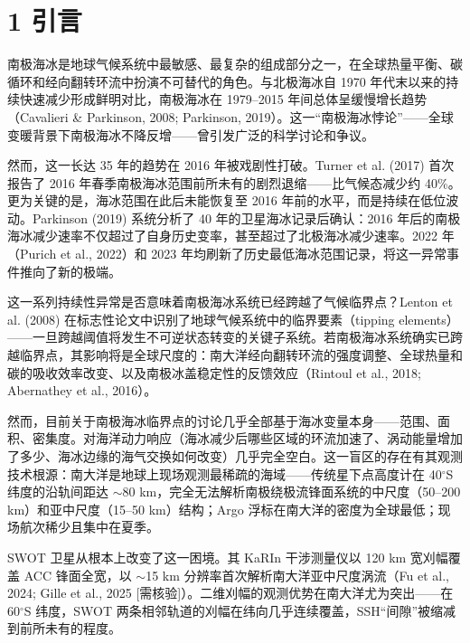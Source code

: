 \documentclass[11pt,a4paper]{article}
\begin{document}
\section*{1  引言}

南极海冰是地球气候系统中最敏感、最复杂的组成部分之一，在全球热量平衡、碳循环和经向翻转环流中扮演不可替代的角色。与北极海冰自 1970 年代末以来的持续快速减少形成鲜明对比，南极海冰在 1979--2015 年间总体呈缓慢增长趋势（Cavalieri \& Parkinson, 2008; Parkinson, 2019）。这一``南极海冰悖论''——全球变暖背景下南极海冰不降反增——曾引发广泛的科学讨论和争议。\par

然而，这一长达 35 年的趋势在 2016 年被戏剧性打破。Turner et al. (2017) 首次报告了 2016 年春季南极海冰范围前所未有的剧烈退缩——比气候态减少约 40\%。更为关键的是，海冰范围在此后未能恢复至 2016 年前的水平，而是持续在低位波动。Parkinson (2019) 系统分析了 40 年的卫星海冰记录后确认：2016 年后的南极海冰减少速率不仅超过了自身历史变率，甚至超过了北极海冰减少速率。2022 年（Purich et al., 2022）和 2023 年均刷新了历史最低海冰范围记录，将这一异常事件推向了新的极端。\par

这一系列持续性异常是否意味着南极海冰系统已经跨越了气候临界点？Lenton et al. (2008) 在标志性论文中识别了地球气候系统中的临界要素（tipping elements）——一旦跨越阈值将发生不可逆状态转变的关键子系统。若南极海冰系统确实已跨越临界点，其影响将是全球尺度的：南大洋经向翻转环流的强度调整、全球热量和碳的吸收效率改变、以及南极冰盖稳定性的反馈效应（Rintoul et al., 2018; Abernathey et al., 2016）。\par

然而，目前关于南极海冰临界点的讨论几乎全部基于海冰变量本身——范围、面积、密集度。对海洋动力响应（海冰减少后哪些区域的环流加速了、涡动能量增加了多少、海冰边缘的海气交换如何改变）几乎完全空白。这一盲区的存在有其观测技术根源：南大洋是地球上现场观测最稀疏的海域——传统星下点高度计在 40$^\circ$S 纬度的沿轨间距达 $\sim$80 km，完全无法解析南极绕极流锋面系统的中尺度（50--200 km）和亚中尺度（15--50 km）结构；Argo 浮标在南大洋的密度为全球最低；现场航次稀少且集中在夏季。\par

SWOT 卫星从根本上改变了这一困境。其 KaRIn 干涉测量仪以 120 km 宽刈幅覆盖 ACC 锋面全宽，以 $\sim$15 km 分辨率首次解析南大洋亚中尺度涡流（Fu et al., 2024; Gille et al., 2025 [需核验]）。二维刈幅的观测优势在南大洋尤为突出——在 60$^\circ$S 纬度，SWOT 两条相邻轨道的刈幅在纬向几乎连续覆盖，SSH``间隙''被缩减到前所未有的程度。\par
\end{document}
